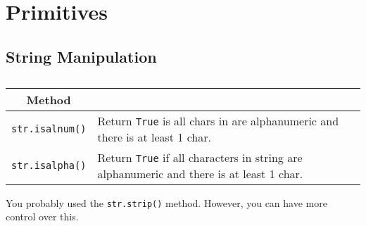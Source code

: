 \section{Primitives}  

  \subsection{String Manipulation} 

    \begin{definition}
      \begin{table}[H]
        \centering
        \begin{tabular}{|c|p{8cm}|}
          \hline
          \textbf{Method} & \textbf{} \\
          \hline
          \texttt{str.isalnum()} & Return \texttt{True} is all chars in are alphanumeric and there is at least 1 char.\\ 
          \texttt{str.isalpha()} & Return \texttt{True} if all characters in string are alphanumeric and there is at least 1 char. \\ 
          \hline 
        \end{tabular}
        \caption{}
      \end{table}
    \end{definition}

    You probably used the \texttt{str.strip()} method. However, you can have more control over this. 


